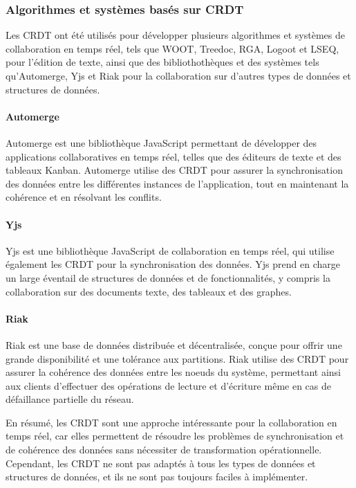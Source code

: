 \subsubsection{Algorithmes et systèmes basés sur CRDT}

Les CRDT ont été utilisés pour développer plusieurs algorithmes et systèmes de collaboration en temps réel, tels que WOOT, Treedoc, RGA, Logoot et LSEQ, pour l'édition de texte, ainsi que des bibliothothèques et des systèmes tels qu'Automerge, Yjs et Riak pour la collaboration sur d'autres types de données et structures de données.

\paragraph{Automerge\cite{automerge}}

Automerge est une bibliothèque JavaScript permettant de développer des applications collaboratives en temps réel, telles que des éditeurs de texte et des tableaux Kanban. Automerge utilise des CRDT pour assurer la synchronisation des données entre les différentes instances de l'application, tout en maintenant la cohérence et en résolvant les conflits.

\paragraph{Yjs\cite{yjs}}

Yjs est une bibliothèque JavaScript de collaboration en temps réel, qui utilise également les CRDT pour la synchronisation des données. Yjs prend en charge un large éventail de structures de données et de fonctionnalités, y compris la collaboration sur des documents texte, des tableaux et des graphes.

\paragraph{Riak\cite{riak}}

Riak est une base de données distribuée et décentralisée, conçue pour offrir une grande disponibilité et une tolérance aux partitions. Riak utilise des CRDT pour assurer la cohérence des données entre les noeuds du système, permettant ainsi aux clients d'effectuer des opérations de lecture et d'écriture même en cas de défaillance partielle du réseau.

En résumé, les CRDT sont une approche intéressante pour la collaboration en temps réel, car elles permettent de résoudre les problèmes de synchronisation et de cohérence des données sans nécessiter de transformation opérationnelle. Cependant, les CRDT ne sont pas adaptés à tous les types de données et structures de données, et ils ne sont pas toujours faciles à implémenter.

